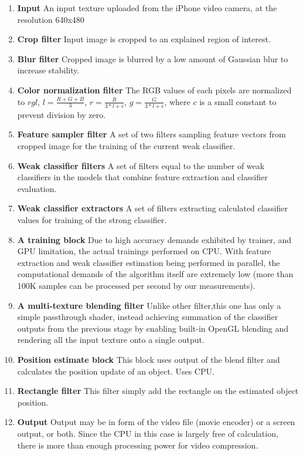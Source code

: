 \begin{enumerate}
\item {\bf Input} An input texture uploaded from the iPhone video camera, at the resolution 640x480
\item {\bf Crop filter} Input image is cropped to an explained region of interest.
\item {\bf Blur filter} Cropped image is blurred by a low amount of Gaussian blur to increase stability.
\item {\bf Color normalization filter} The RGB values of each pixels are normalized to $rgl$, $l=\frac{R+G+B}{3}$, $r=\frac{R}{3*l+c}$, $g=\frac{G}{3*l+c}$, where $c$ is a small constant to prevent division by zero.
\item {\bf Feature sampler filter} A set of two filters sampling feature vectors from cropped image for the training of the current weak classifier. 
\item {\bf Weak classifier filters} A set of filters equal to the number of weak classifiers in the models that combine feature extraction and classifier evaluation.
\item {\bf Weak classifier extractors} A set of filters extracting calculated classifier values for training of the strong classifier.
\item {\bf A training block} Due to high accuracy demands exhibited by trainer, and GPU limitation, the actual trainings performed on CPU. With feature extraction and weak classifier estimation being performed in parallel, the computational demands of the algorithm itself are extremely low (more than 100K samples can be processed per second by our measurements). 
\item {\bf A multi-texture blending filter} Unlike other filter,this one has only a simple passthrough shader, instead achieving summation of the classifier outputs from the previous stage by  enabling built-in OpenGL blending and rendering all the input texture onto a single output. 
\item {\bf Position estimate block} This block uses output of the blend filter and calculates the position update of an object. Uses CPU. 
\item {\bf Rectangle filter} This filter simply add the rectangle on the estimated object position. 
\item {\bf Output} Output may be in form of the video file (movie encoder) or a screen output, or both. Since the CPU in this case is largely free of calculation, there is more than enough processing power for video compression. 
\end{enumerate}


